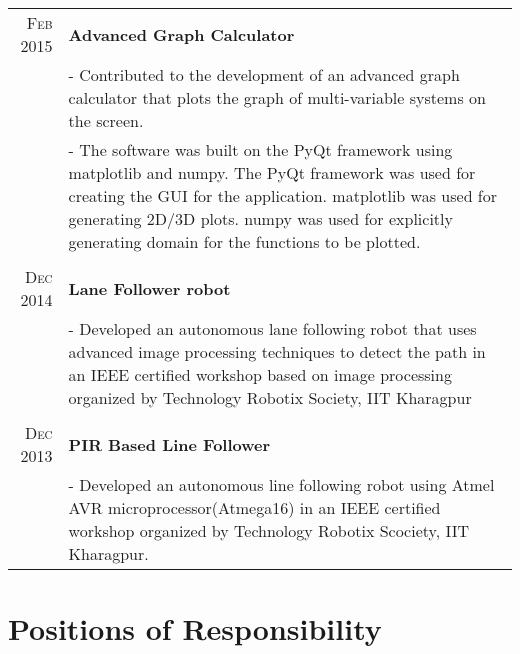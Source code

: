 \documentclass[a4paper,10pt]{article} %
\begin{document}
\begin{tabular}{r|p{11cm}}

\textsc{Feb 2015} & \textbf{Advanced Graph Calculator} \\
& \footnotesize{- Contributed to the development of an advanced graph calculator that plots the graph of multi-variable systems on the screen.}\\
& \footnotesize{- The software was built on the PyQt framework using matplotlib and numpy. The PyQt framework was used for creating the GUI for the application. matplotlib was used for generating 2D/3D plots. numpy was used for explicitly generating domain for the functions to be plotted.}\\
\multicolumn{2}{c}{} \\

\textsc{Dec 2014} & \textbf{Lane Follower robot} \\
& \footnotesize{- Developed an autonomous lane following robot that uses advanced image processing techniques to detect the path in an IEEE certified workshop based on image processing organized by Technology Robotix Society, IIT Kharagpur}\\
\multicolumn{2}{c}{} \\

\textsc{Dec 2013} & \textbf{PIR Based Line Follower} \\
& \footnotesize{- Developed an autonomous line following robot using Atmel AVR microprocessor(Atmega16) in an IEEE certified workshop organized by Technology Robotix Scociety, IIT Kharagpur.}\\
\end{tabular}



\section{Positions of Responsibility}
\end{document}
